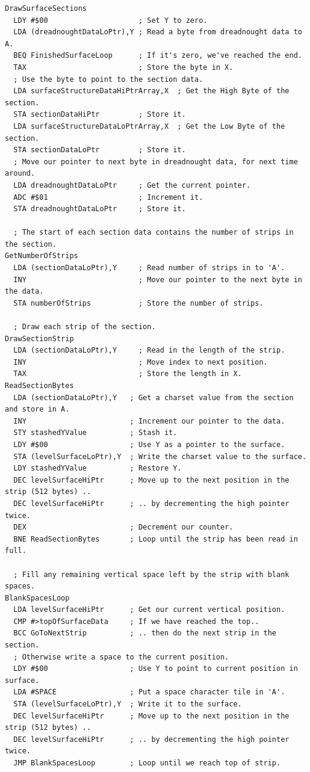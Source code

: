 \clearpage

\begin{lstlisting}[basicstyle=\scriptsize\ttfamily]
DrawSurfaceSections   
  LDY #$00                     ; Set Y to zero.
  LDA (dreadnoughtDataLoPtr),Y ; Read a byte from dreadnought data to A.
  BEQ FinishedSurfaceLoop      ; If it's zero, we've reached the end.
  TAX                          ; Store the byte in X.
  ; Use the byte to point to the section data.
  LDA surfaceStructureDataHiPtrArray,X  ; Get the High Byte of the section.
  STA sectionDataHiPtr         ; Store it.
  LDA surfaceStructureDataLoPtrArray,X  ; Get the Low Byte of the section.
  STA sectionDataLoPtr         ; Store it.
  ; Move our pointer to next byte in dreadnought data, for next time around.
  LDA dreadnoughtDataLoPtr     ; Get the current pointer.
  ADC #$01                     ; Increment it.
  STA dreadnoughtDataLoPtr     ; Store it.

  ; The start of each section data contains the number of strips in the section.
GetNumberOfStrips   
  LDA (sectionDataLoPtr),Y     ; Read number of strips in to 'A'.
  INY                          ; Move our pointer to the next byte in the data.
  STA numberOfStrips           ; Store the number of strips.

  ; Draw each strip of the section.
DrawSectionStrip   
  LDA (sectionDataLoPtr),Y     ; Read in the length of the strip.
  INY                          ; Move index to next position.
  TAX                          ; Store the length in X.
ReadSectionBytes   
  LDA (sectionDataLoPtr),Y   ; Get a charset value from the section and store in A.
  INY                        ; Increment our pointer to the data.
  STY stashedYValue          ; Stash it.
  LDY #$00                   ; Use Y as a pointer to the surface. 
  STA (levelSurfaceLoPtr),Y  ; Write the charset value to the surface.
  LDY stashedYValue          ; Restore Y.
  DEC levelSurfaceHiPtr      ; Move up to the next position in the strip (512 bytes) ..
  DEC levelSurfaceHiPtr      ; .. by decrementing the high pointer twice.
  DEX                        ; Decrement our counter.
  BNE ReadSectionBytes       ; Loop until the strip has been read in full.

  ; Fill any remaining vertical space left by the strip with blank spaces.
BlankSpacesLoop   
  LDA levelSurfaceHiPtr      ; Get our current vertical position.
  CMP #>topOfSurfaceData     ; If we have reached the top..
  BCC GoToNextStrip          ; .. then do the next strip in the section.
  ; Otherwise write a space to the current position.
  LDY #$00                   ; Use Y to point to current position in surface.
  LDA #SPACE                 ; Put a space character tile in 'A'.
  STA (levelSurfaceLoPtr),Y  ; Write it to the surface.
  DEC levelSurfaceHiPtr      ; Move up to the next position in the strip (512 bytes) ..
  DEC levelSurfaceHiPtr      ; .. by decrementing the high pointer twice.
  JMP BlankSpacesLoop        ; Loop until we reach top of strip.


\end{lstlisting}
